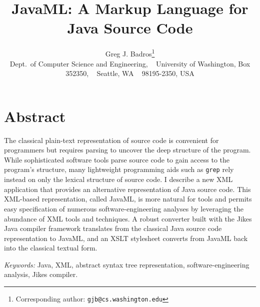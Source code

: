 \documentclass{article}
\begin{document}

\newcommand{\smtexttt}[1]{{\small\texttt{#1}}}
\newcommand{\ignore}[1]{}
\newenvironment{smverbatim}{\small \begin{verbatim}}{\end{verbatim}}
\newenvironment{shellcommand}{\begin{verbatim}}{\end{verbatim}}
\newenvironment{shelloutput}{\begin{verbatim}}{\end{verbatim}}

\title{JavaML: A Markup Language for Java Source Code}
\author{Greg J. Badros\thanks{Corresponding author: \smtexttt{gjb@cs.washington.edu}}
\\ \small
Dept.\ of Computer Science and Engineering, ~
University of Washington, Box 352350, ~
Seattle, WA ~ 98195-2350, USA}
\date{}

\maketitle
\thispagestyle{empty}

\vspace*{-1cm}

\section*{Abstract}
The classical plain-text representation of source code is convenient for
programmers but requires parsing to uncover the deep structure of the
program.  While sophisticated software tools parse source code to gain
access to the program's structure, many lightweight programming aids
such as \smtexttt{grep} rely instead on only the lexical structure of
source code.  I describe a new XML application that provides an
alternative representation of Java source code. This XML-based
representation, called JavaML, is more natural for tools and permits
easy specification of numerous software-engineering analyses by
leveraging the abundance of XML tools and techniques.  A robust
converter built with the Jikes Java compiler framework translates
from the classical Java source code representation to JavaML, and an
XSLT stylesheet converts from JavaML back into the classical textual
form.

\vspace*{.2cm} 
\noindent \textit{Keywords:}
Java, XML, abstract syntax tree representation, software-engineering
analysis, Jikes compiler.
\end{document}
